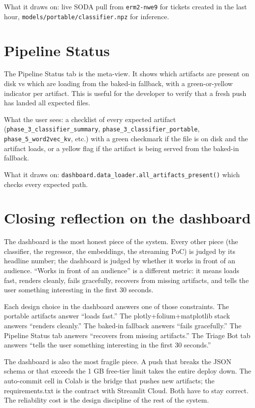 \documentclass[11pt,letterpaper]{book}
\begin{document}
What it draws on: live SODA pull from \texttt{erm2-nwe9} for tickets created in the last hour, \texttt{models/portable/classifier.npz} for inference.

\section{Pipeline Status}

The Pipeline Status tab is the meta-view. It shows which artifacts are present on disk vs which are loading from the baked-in fallback, with a green-or-yellow indicator per artifact. This is useful for the developer to verify that a fresh push has landed all expected files.

What the user sees: a checklist of every expected artifact (\texttt{phase\_3\_classifier\_summary}, \texttt{phase\_3\_classifier\_portable}, \texttt{phase\_5\_word2vec\_kv}, etc.) with a green checkmark if the file is on disk and the artifact loads, or a yellow flag if the artifact is being served from the baked-in fallback.

What it draws on: \texttt{dashboard.data\_loader.all\_artifacts\_present()} which checks every expected path.

\section{Closing reflection on the dashboard}

The dashboard is the most honest piece of the system. Every other piece (the classifier, the regressor, the embeddings, the streaming PoC) is judged by its headline number; the dashboard is judged by whether it works in front of an audience. ``Works in front of an audience'' is a different metric: it means loads fast, renders cleanly, fails gracefully, recovers from missing artifacts, and tells the user something interesting in the first 30 seconds.

Each design choice in the dashboard answers one of those constraints. The portable artifacts answer ``loads fast.'' The plotly+folium+matplotlib stack answers ``renders cleanly.'' The baked-in fallback answers ``fails gracefully.'' The Pipeline Status tab answers ``recovers from missing artifacts.'' The Triage Bot tab answers ``tells the user something interesting in the first 30 seconds.''

The dashboard is also the most fragile piece. A push that breaks the JSON schema or that exceeds the 1 GB free-tier limit takes the entire deploy down. The auto-commit cell in Colab is the bridge that pushes new artifacts; the requirements.txt is the contract with Streamlit Cloud. Both have to stay correct. The reliability cost is the design discipline of the rest of the system.
\end{document}
